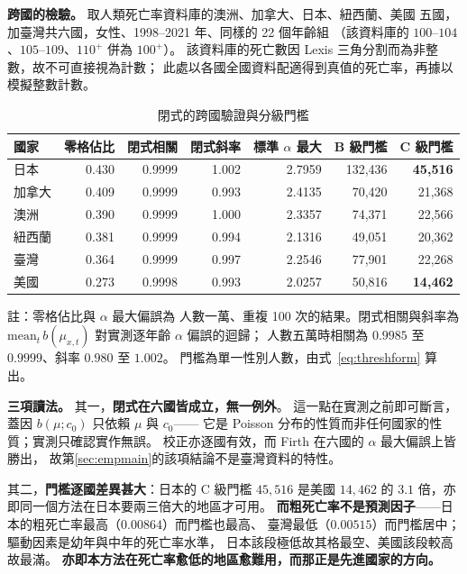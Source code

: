 \documentclass[UTF8, fontset=macnew, a4paper, 12pt]{ctexart}
\begin{document}
\textbf{跨國的檢驗。} 取人類死亡率資料庫的澳洲、加拿大、日本、紐西蘭、美國
五國，加臺灣共六國，女性、1998--2021 年、同樣的 22 個年齡組
（該資料庫的 $100$--$104$、$105$--$109$、$110^{+}$ 併為 $100^{+}$）。
該資料庫的死亡數因 Lexis 三角分割而為非整數，故不可直接視為計數；
此處以各國全國資料配適得到真值的死亡率，再據以模擬整數計數。

\begin{table}[H]
\centering
\caption{閉式的跨國驗證與分級門檻}
\small
\renewcommand{\arraystretch}{1.1}
\begin{tabular}{lrrrrrr}
\toprule
國家 & 零格佔比 & 閉式相關 & 閉式斜率 & 標準 $\alpha$ 最大 & B 級門檻 & C 級門檻\\
\midrule
日本 & 0.430 & 0.9999 & 1.002 & 2.7959 & 132{,}436 & \textbf{45{,}516}\\
加拿大 & 0.409 & 0.9999 & 0.993 & 2.4135 & 70{,}420 & 21{,}368\\
澳洲 & 0.390 & 0.9999 & 1.000 & 2.3357 & 74{,}371 & 22{,}566\\
紐西蘭 & 0.381 & 0.9999 & 0.994 & 2.1316 & 49{,}051 & 20{,}362\\
臺灣 & 0.364 & 0.9999 & 0.997 & 2.2546 & 77{,}901 & 22{,}268\\
美國 & 0.273 & 0.9998 & 0.993 & 2.0257 & 50{,}816 & \textbf{14{,}462}\\
\bottomrule
\end{tabular}

\vspace{2pt}
\parbox{0.92\textwidth}{\footnotesize 註：零格佔比與 $\alpha$ 最大偏誤為
人數一萬、重複 100 次的結果。閉式相關與斜率為
$\mathrm{mean}_t\,b(\mu_{x,t})$ 對實測逐年齡 $\alpha$ 偏誤的迴歸；
人數五萬時相關為 $0.9985$ 至 $0.9999$、斜率 $0.980$ 至 $1.002$。
門檻為單一性別人數，由式~\eqref{eq:threshform} 算出。}
\label{tab:crosscountry}
\end{table}

\textbf{三項讀法。} 其一，\textbf{閉式在六國皆成立，無一例外}。
這一點在實測之前即可斷言，蓋因 $b(\mu;c_0)$ 只依賴 $\mu$ 與 $c_0$——
它是 Poisson 分布的性質而非任何國家的性質；實測只確認實作無誤。
校正亦逐國有效，而 Firth 在六國的 $\alpha$ 最大偏誤上皆勝出，
故第\ref{sec:empmain}的該項結論不是臺灣資料的特性。

其二，\textbf{門檻逐國差異甚大}：日本的 C 級門檻 $45{,}516$ 是美國
$14{,}462$ 的 $3.1$ 倍，亦即同一個方法在日本要兩三倍大的地區才可用。
\textbf{而粗死亡率不是預測因子}——日本的粗死亡率最高（$0.00864$）而門檻也最高、
臺灣最低（$0.00515$）而門檻居中；驅動因素是幼年與中年的死亡率水準，
日本該段極低故其格最空、美國該段較高故最滿。
\textbf{亦即本方法在死亡率愈低的地區愈難用，而那正是先進國家的方向。}
\end{document}
